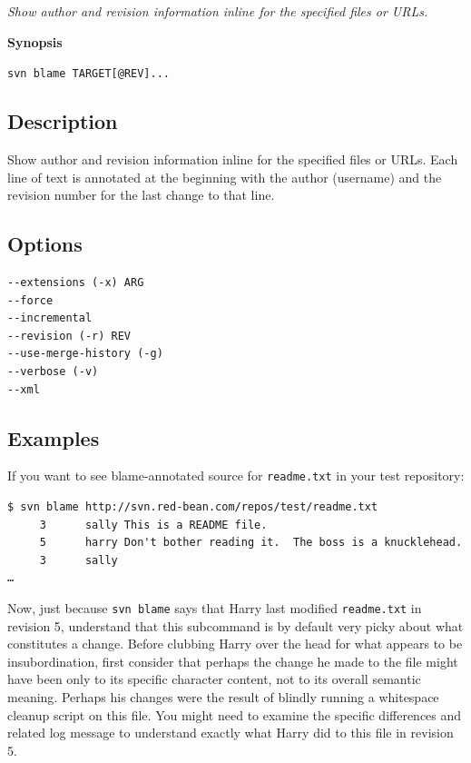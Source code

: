 \emph{Show author and revision information inline for the specified
files or URLs.}

\textbf{Synopsis}

\texttt{svn\ blame\ TARGET{[}@REV{]}...}

\subsection{Description}

Show author and revision information inline for the specified files or
URLs. Each line of text is annotated at the beginning with the author
(username) and the revision number for the last change to that line.

\subsection{Options}

\begin{verbatim}
--extensions (-x) ARG
--force
--incremental
--revision (-r) REV
--use-merge-history (-g)
--verbose (-v)
--xml
\end{verbatim}

\subsection{Examples}

If you want to see blame-annotated source for \texttt{readme.txt} in
your test repository:

\begin{verbatim}
$ svn blame http://svn.red-bean.com/repos/test/readme.txt
     3      sally This is a README file.
     5      harry Don't bother reading it.  The boss is a knucklehead.
     3      sally 
…
\end{verbatim}

Now, just because \texttt{svn\ blame} says that Harry last modified
\texttt{readme.txt} in revision 5, understand that this subcommand is by
default very picky about what constitutes a change. Before clubbing
Harry over the head for what appears to be insubordination, first
consider that perhaps the change he made to the file might have been
only to its specific character content, not to its overall semantic
meaning. Perhaps his changes were the result of blindly running a
whitespace cleanup script on this file. You might need to examine the
specific differences and related log message to understand exactly what
Harry did to this file in revision 5.

